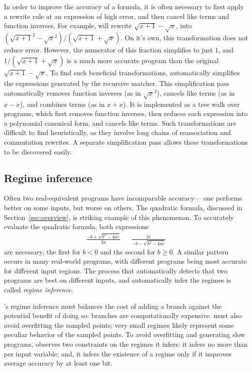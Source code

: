 \documentclass[paper.tex]{subfiles}
\begin{document}
In order to improve the accuracy of a formula,
  it is often necessary to first apply a rewrite rule
  at an expression of high error,
  and then cancel like terms and function inverses.
For example, \casio will rewrite $\sqrt{x+1} - \sqrt{x}$,
  into $(\sqrt{x+1}^2 - \sqrt{x}^2) / (\sqrt{x+1} + \sqrt{x})$.
On it's own, this transformation does not reduce error.
However, the numerator of this fraction simplifies to just $1$,
  and $1/(\sqrt{x+1} + \sqrt{x})$ is a much more accurate program
  than the original $\sqrt{x+1} - \sqrt{x}$.
To find such beneficial transformations,
  \casio automatically simplifies the expressions generated by the recursive matcher.
This simplification pass automatically
  removes function inverses (as in $\sqrt{x}^2$),
  cancels like terms (as in $x - x$),
  and combines terms (as in $x + x$).
It is implemented as a tree walk over programs,
  which first removes function inverses,
  then reduces each expression into a polynomial canonical form,
  and cancels like terms.
Such transformations are difficult to find heuristically, 
  as they involve long chains of reassociation and commutation rewrites.
A separate simplification pass allows these transformations
  to be discovered easily.

\subsection{Regime inference}

Often two real-equivalent programs have incomparable accuracy---%
  one performs better on some inputs, but worse on others.
The quadratic formula, discussed in Section~\ref{sec:overview},
  is striking example of this phenomenon.
To accurately evaluate the quadratic formula,
  both expressions
\begin{align*}
  \frac{-b + \sqrt{b^2 - 4 a c}}{2 a} &&
  \frac{2 c}{-b - \sqrt{b^2 - 4 a c}}
\end{align*}
  are necessary,
  the first for $b < 0$ and the second for $b \ge 0$.
A similar pattern occurs in many real-world programs,
  with different programs being most accurate
  for different input regions.
The process that automatically detects
  that two programs are best on different inputs,
  and automatically infer the regimes
  is called \emph{regime inference}.

\casio's regime inference must balances
  the cost of adding a branch against the potential benefit of doing so:
  branches are computationally expensive.
\casio must also avoid overfitting the sampled points;
  very small regimes likely represent
  some peculiar behavior of the sampled points.
To avoid overfitting and generating slow programs,
  \casio observes two constraints on the regimes it infers:
  it infers no more than \nRegimes per input variable;
  and, it infers the existence of a regime
  only if it improves average accuracy by at least one bit.
\end{document}
